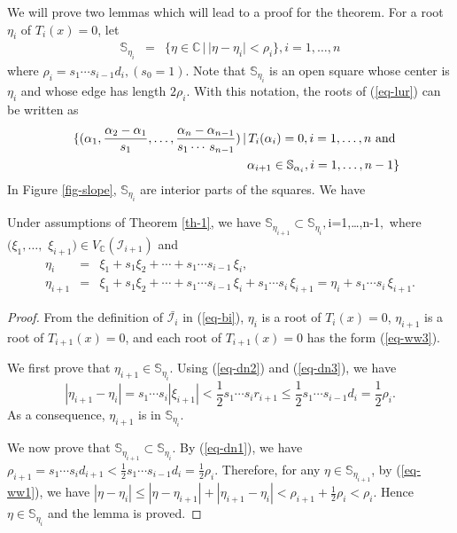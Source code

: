 \documentclass[amsthm]{JSC_LaTex_2007_Mar_12/elsart}
\def\bref#1{(\ref{#1})}
\def\C{{\mathbb{C}}}
\def\IS{{\mathcal{I}}}
\begin{document}
We will prove two lemmas which will lead to a proof for the theorem.
For a root $\eta_i$ of $T_i(x)=0$, let
\begin{eqnarray}\label{eq-nbh}
\mathbb{S}_{\eta_{i}}&=& \{\eta\in\C\, | \, |\eta-\eta_i|<\rho_i \},
i=1,\ldots,n
\end{eqnarray}
where $\rho_i=s_1\cdots s_{i-1}d_{i}, (s_0=1)$.
Note that $\mathbb{S}_{\eta_{i}}$ is an open square whose center is
$\eta_i$ and whose edge has length $2\rho_i$.
With this notation, the {roots} of \bref{eq-lur} can be written as
\begin{eqnarray}\label{eq-rt1}
&&
\{(\alpha_1,\frac{\alpha_2-\alpha_1}{s_1},\ldots,\frac{\alpha_n-\alpha_{n-1}}{s_1\cdots\,s_{n-1}})
 \, |\, T_i(\alpha_i)=0, i=1,\ldots,n \hbox{ and }\nonumber\\
&& \alpha_{i+1}\in\mathbb{S}_{\alpha_{i}}, i=1,\ldots,n-1 \}
\end{eqnarray}
In Figure \ref{fig-slope}, $\mathbb{S}_{\eta_{i}}$ are interior
parts of the squares.
We have
\begin{lem}\label{lm-ww0}
Under assumptions of Theorem \ref{th-1}, we have
$\mathbb{S}_{\eta_{i+1}} \subset \mathbb{S}_{\eta_{i}},
$i=1,\ldots,n-1$,$ where $(\xi_1,\ldots,$ $\xi_{i+1})\in
V_{\C}(\IS_{i+1})$ and
\begin{eqnarray}
\eta_{i}&=&\xi_1+s_1\xi_2+\cdots+s_1\cdots
s_{i-1}\,\xi_{i},\label{eq-ww4}\\
\eta_{i+1}&=&\xi_1+s_1\xi_2+\cdots+s_1\cdots
s_{i-1}\,\xi_{i}+s_1\cdots
 s_{i}\,\xi_{i+1} = \eta_{i} +s_1\cdots
 s_{i}\,\xi_{i+1}.\label{eq-ww3}
\end{eqnarray}
\end{lem}
\begin{proof}
From the definition of $\bar{\IS_i}$ in \bref{eq-bi}, $\eta_{i}$ is
a root of $T_i(x)=0$, $\eta_{i+1}$ is a root of $T_{i+1}(x)=0$, and
each root of $T_{i+1}(x)=0$ has the form \bref{eq-ww3}.

We first prove that  $\eta_{i+1}\in \mathbb{S}_{\eta_{i}}$.
Using \bref{eq-dn2} and \bref{eq-dn3}, we have
\begin{equation}\label{eq-ww1}
 |\eta_{i+1}-\eta_{i}|=s_1\cdots s_{i}|\xi_{i+1}|
 <\frac{1}{2}s_1\cdots s_{i}r_{i+1} \le \frac{1}{2}s_1\cdots
s_{i-1}d_{i} = \frac{1}{2}\rho_i.\end{equation}
As a consequence, $\eta_{i+1}$ is in $\mathbb{S}_{\eta_{i}}$.

We now prove that $\mathbb{S}_{\eta_{i+1}}\subset
\mathbb{S}_{\eta_{i}}$. By \bref{eq-dn1}, we have $\rho_{i+1} =
s_1\cdots s_{i}d_{i+1} < \frac{1}{2}  s_1\cdots s_{i-1}d_{i} =
\frac{1}{2}\rho_i$. Therefore, for any $\eta\in
\mathbb{S}_{\eta_{i+1}}$, by \bref{eq-ww1}, we have $|\eta-\eta_i|
\le |\eta-\eta_{i+1}| + |\eta_{i+1}-\eta_i| < \rho_{i+1} +
\frac{1}{2}\rho_i < \rho_i$. Hence $\eta\in \mathbb{S}_{\eta_{i}}$
and the lemma is proved.
\end{proof}
\end{document}
